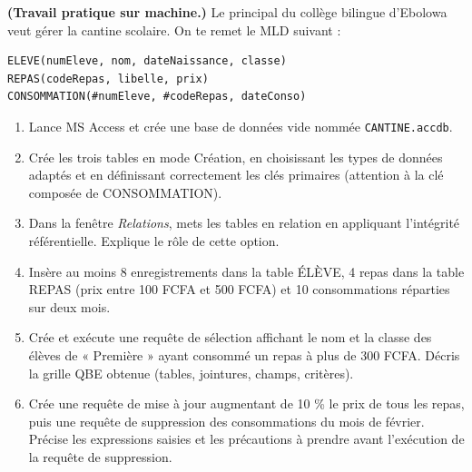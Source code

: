 \documentclass[11pt]{article}
\begin{document}
\begin{exercice}
\textbf{(Travail pratique sur machine.)} Le principal du collège bilingue d'Ebolowa veut gérer la cantine scolaire. On te remet le MLD suivant :

\begin{lstlisting}
ELEVE(numEleve, nom, dateNaissance, classe)
REPAS(codeRepas, libelle, prix)
CONSOMMATION(#numEleve, #codeRepas, dateConso)
\end{lstlisting}

\begin{enumerate}
  \item Lance MS Access et crée une base de données vide nommée \texttt{CANTINE.accdb}.
  \item Crée les trois tables en mode Création, en choisissant les types de données adaptés et en définissant correctement les clés primaires (attention à la clé composée de CONSOMMATION).
  \item Dans la fenêtre \emph{Relations}, mets les tables en relation en appliquant l'intégrité référentielle. Explique le rôle de cette option.
  \item Insère au moins 8 enregistrements dans la table ÉLÈVE, 4 repas dans la table REPAS (prix entre 100 FCFA et 500 FCFA) et 10 consommations réparties sur deux mois.
  \item Crée et exécute une requête de sélection affichant le nom et la classe des élèves de « Première » ayant consommé un repas à plus de 300 FCFA. Décris la grille QBE obtenue (tables, jointures, champs, critères).
  \item Crée une requête de mise à jour augmentant de 10 \% le prix de tous les repas, puis une requête de suppression des consommations du mois de février. Précise les expressions saisies et les précautions à prendre avant l'exécution de la requête de suppression.
\end{enumerate}
\end{exercice}
\end{document}
